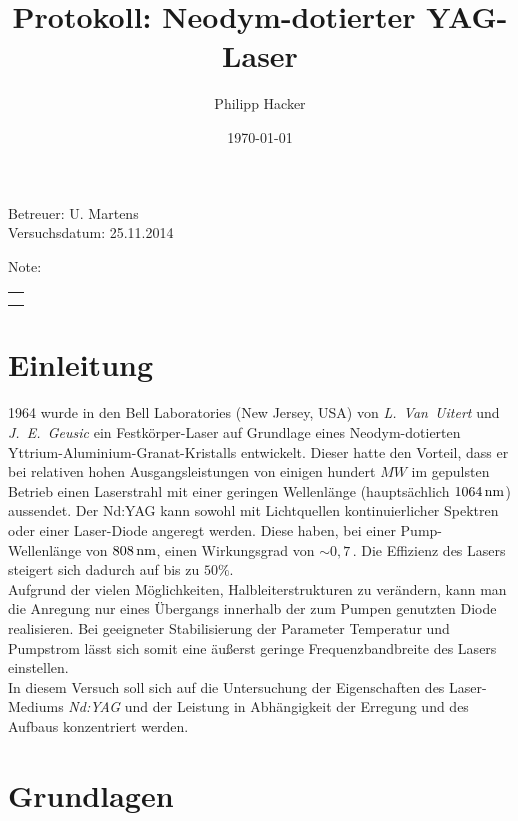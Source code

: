 \documentclass[numbers=noenddot,12pt,a4paper]{scrartcl}
\title{Protokoll: Neodym-dotierter YAG-Laser} %
\author{Philipp Hacker} %
\date{\today}
\newcommand{\tilt}[1]{\mbox{\textit{#1}}}
\begin{document}
\maketitle
\begin{center}
Betreuer: U. Martens\\ %
Versuchsdatum: 25.11.2014\\ %
\begin{table}[h]
\centering
Note: %
\begin{tabularx}{1.5cm}{|X|}
\hline \\ \\
\hline
\end{tabularx}
\end{table}
\end{center}
\vspace*{\fill}
\tableofcontents
\vfill
\newpage
\section{Einleitung}
1964 wurde in den Bell Laboratories (New Jersey, USA) von \tilt{L. Van Uitert} und \tilt{J. E. Geusic} ein Festkörper-Laser auf Grundlage eines Neodym-dotierten Yttrium-Aluminium-Granat-Kristalls entwickelt. Dieser hatte den Vorteil, dass er bei relativen hohen Ausgangsleistungen von einigen hundert $\unit{MW}$ im gepulsten Betrieb einen Laserstrahl mit einer geringen Wellenlänge (hauptsächlich $\unit[1064]{nm}$) aussendet. Der Nd:YAG kann sowohl mit Lichtquellen kontinuierlicher Spektren oder einer Laser-Diode angeregt werden. Diese haben, bei einer Pump-Wellenlänge von $\unit[808]{nm}$, einen Wirkungsgrad von $\sim0,7\,$. Die Effizienz des Lasers steigert sich dadurch auf bis zu $50\%$.\\ Aufgrund der vielen Möglichkeiten, Halbleiterstrukturen zu verändern, kann man die Anregung nur eines Übergangs innerhalb der zum Pumpen genutzten Diode realisieren. Bei geeigneter Stabilisierung der Parameter Temperatur und Pumpstrom lässt sich somit eine äußerst geringe Frequenzbandbreite des Lasers einstellen. \\
In diesem Versuch soll sich auf die Untersuchung der Eigenschaften des Laser-Mediums \tilt{Nd:YAG} und der Leistung in Abhängigkeit der Erregung und des Aufbaus konzentriert werden.
\newpage
\section{Grundlagen}
\end{document}
